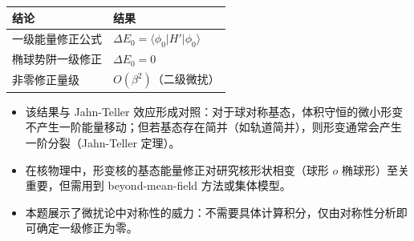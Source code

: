 \begin{formulabox}[答案汇总]
\begin{center}
\begin{tabular}{ll}
\toprule
\textbf{结论} & \textbf{结果} \\
\midrule
一级能量修正公式 & $\Delta E_0=\langle\phi_0|H'|\phi_0\rangle$ \\
椭球势阱一级修正 & $\Delta E_0=0$ \\
非零修正量级 & $O(\beta^2)$（二级微扰） \\
\bottomrule
\end{tabular}
\end{center}
\end{formulabox}

\begin{insightbox}[物理图像]
\begin{itemize}
    \item 该结果与 Jahn-Teller 效应形成对照：对于球对称基态，体积守恒的微小形变不产生一阶能量移动；但若基态存在简并（如轨道简并），则形变通常会产生一阶分裂（Jahn-Teller 定理）。
    \item 在核物理中，形变核的基态能量修正对研究核形状相变（球形 $	o$ 椭球形）至关重要，但需用到 beyond-mean-field 方法或集体模型。
    \item 本题展示了微扰论中对称性的威力：不需要具体计算积分，仅由对称性分析即可确定一级修正为零。
\end{itemize}
\end{insightbox}
